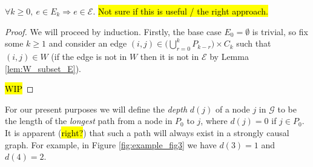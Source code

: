 \documentclass[12pt]{article}
\def\gcg{\mathcal{G}}  %
\begin{document}
\begin{lemma}
  \label{lem:loop_invariant}
  $\forall k \ge 0,\ e \in E_k \Rightarrow e \in \mathcal{E}$.
  \hl{Not sure if this is useful / the right approach.}
\end{lemma}
\begin{proof}
  We will proceed by induction.  Firstly, the base case
  $E_0 = \emptyset$ is trivial, so fix some $k \ge 1$ and consider an
  edge $(i, j) \in \big(\bigcup_{r = 0}^k P_{k - r} \big) \times C_k$
  such that $(i, j) \in W$ (if the edge is not in $W$ then it is not
  in $\mathcal{E}$ by Lemma \ref{lem:W_subset_E}).

  \hl{WIP}
\end{proof}

\begin{definition}[Depth]
  For our present purposes we will define the \textit{depth} $d(j)$ of
  a node $j$ in $\gcg$ to be the length of the \textit{longest} path
  from a node in $P_0$ to $j$, where $d(j) = 0$ if $j \in P_0$.  It is
  apparent (\hl{right?}) that such a path will always exist in a
  strongly causal graph.  For example, in Figure
  \ref{fig:example_fig3} we have $d(3) = 1$ and $d(4) = 2$.
\end{definition}
\end{document}
